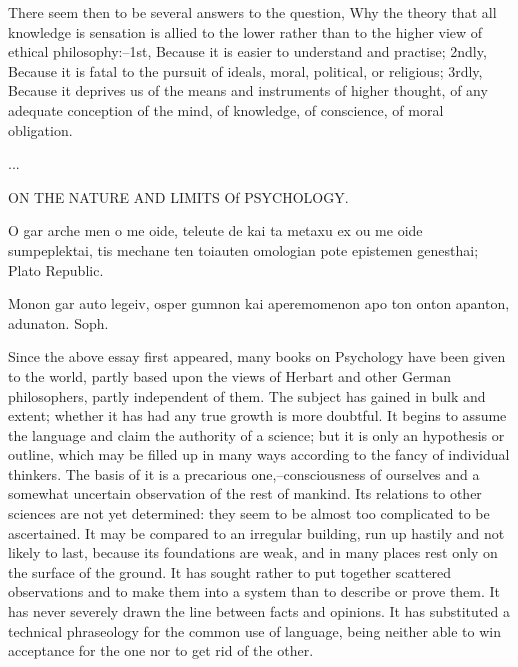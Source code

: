 There seem then to be several answers to the question, Why the theory
that all knowledge is sensation is allied to the lower rather than to
the higher view of ethical philosophy:--1st, Because it is easier to
understand and practise; 2ndly, Because it is fatal to the pursuit of
ideals, moral, political, or religious; 3rdly, Because it deprives us of
the means and instruments of higher thought, of any adequate conception
of the mind, of knowledge, of conscience, of moral obligation.

...

ON THE NATURE AND LIMITS Of PSYCHOLOGY.

     O gar arche men o me oide, teleute de kai ta metaxu ex ou me
     oide sumpeplektai, tis mechane ten toiauten omologian pote
     epistemen genesthai; Plato Republic.

     Monon gar auto legeiv, osper gumnon kai aperemomenon apo ton
     onton apanton, adunaton.  Soph.

Since the above essay first appeared, many books on Psychology have been
given to the world, partly based upon the views of Herbart and other
German philosophers, partly independent of them. The subject has gained
in bulk and extent; whether it has had any true growth is more doubtful.
It begins to assume the language and claim the authority of a science;
but it is only an hypothesis or outline, which may be filled up in many
ways according to the fancy of individual thinkers. The basis of it is
a precarious one,--consciousness of ourselves and a somewhat uncertain
observation of the rest of mankind. Its relations to other sciences
are not yet determined: they seem to be almost too complicated to be
ascertained. It may be compared to an irregular building, run up hastily
and not likely to last, because its foundations are weak, and in many
places rest only on the surface of the ground. It has sought rather to
put together scattered observations and to make them into a system than
to describe or prove them. It has never severely drawn the line between
facts and opinions. It has substituted a technical phraseology for the
common use of language, being neither able to win acceptance for the one
nor to get rid of the other.

